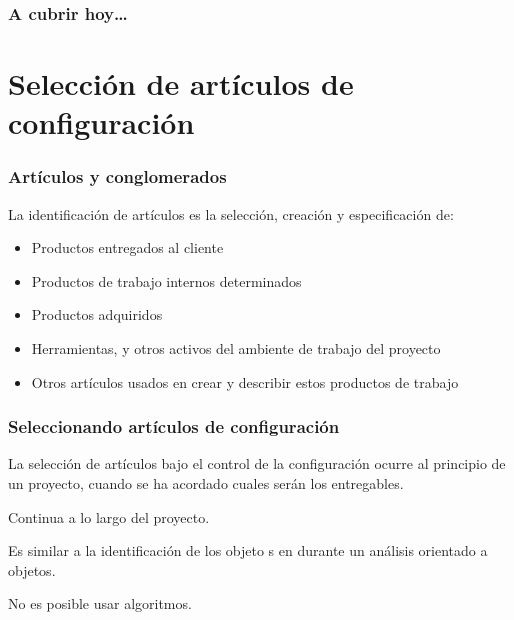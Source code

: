 
\theoremstyle{definition}
\newtheorem{definicion}{Definici\'on}

\begin{frame}
\titlepage
\end{frame}

\begin{frame}
\frametitle{A cubrir hoy\ldots}
\tableofcontents
\end{frame}

\section{Selecci\'on de art\'iculos de configuraci\'on}
\begin{frame}
	\frametitle{Art\'iculos y conglomerados}
	
La identificaci\'on de art\'iculos es la selecci\'on, creaci\'on y especificaci\'on de: 
	\begin{itemize}
		\item Productos entregados al cliente
		\item Productos de trabajo internos determinados
		\item Productos adquiridos
		\item Herramientas, y otros activos del ambiente de trabajo del proyecto
		\item Otros art\'iculos usados en crear y describir estos productos de trabajo
	\end{itemize}
\end{frame}

\begin{frame}
	\frametitle{Seleccionando art\'iculos de configuraci\'on}
	La selecci\'on de art\'iculos bajo el control de la configuraci\'on 
	ocurre al principio de un proyecto, cuando se ha acordado cuales ser\'an
	los entregables. 

	Continua a lo largo del proyecto. 

	Es similar a la identificaci\'on de los objeto	s en durante un an\'alisis orientado a objetos. 

	No es posible usar algoritmos. 
\end{frame}

